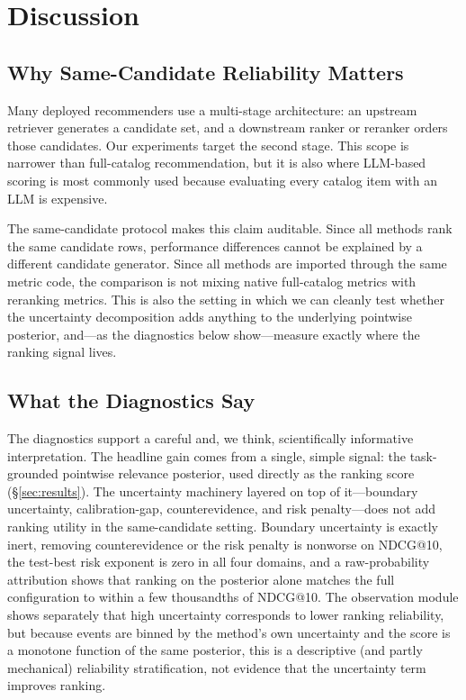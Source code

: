 \section{Discussion}
\label{sec:analysis}

\subsection{Why Same-Candidate Reliability Matters}

Many deployed recommenders use a multi-stage architecture: an upstream retriever
generates a candidate set, and a downstream ranker or reranker orders those
candidates. Our experiments target the second stage. This scope is narrower
than full-catalog recommendation, but it is also where LLM-based scoring is
most commonly used because evaluating every catalog item with an LLM is
expensive.

The same-candidate protocol makes this claim auditable. Since all methods rank
the same candidate rows, performance differences cannot be explained by a
different candidate generator. Since all methods are imported through the same
metric code, the comparison is not mixing native full-catalog metrics with
reranking metrics. This is also the setting in which we can cleanly test whether
the uncertainty decomposition adds anything to the underlying pointwise
posterior, and---as the diagnostics below show---measure exactly where the
ranking signal lives.

\subsection{What the Diagnostics Say}

The diagnostics support a careful and, we think, scientifically informative
interpretation. The headline gain comes from a single, simple signal: the
task-grounded pointwise relevance posterior, used directly as the ranking score
(\S\ref{sec:results}). The uncertainty machinery layered on top of it---boundary
uncertainty, calibration-gap, counterevidence, and risk penalty---does not add
ranking utility in the same-candidate setting. Boundary uncertainty is exactly
inert, removing counterevidence or the risk penalty is nonworse on NDCG@10, the
test-best risk exponent is zero in all four domains, and a raw-probability
attribution shows that ranking on the posterior alone matches the full
configuration to within a few thousandths of NDCG@10. The observation module
shows separately that high uncertainty corresponds to lower ranking reliability,
but because events are binned by the method's own uncertainty and the score is a
monotone function of the same posterior, this is a descriptive (and partly
mechanical) reliability stratification, not evidence that the uncertainty term
improves ranking.

